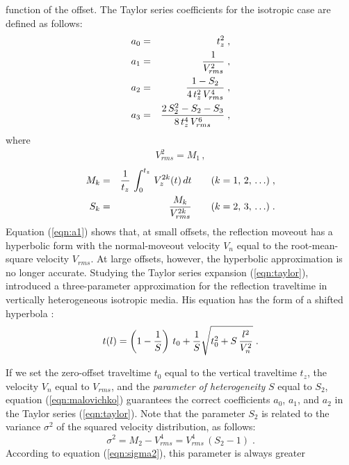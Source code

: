 function of the offset.  The Taylor series coefficients for the isotropic case
are defined as follows:
\begin{eqnarray}
a_0 & = & t_z^2\;,
\label{eqn:a0} \\
a_1 & = & {1 \over V_{rms}^2}\;,
\label{eqn:a1} \\
a_2 & = & {{1 - S_2} \over {4\,t_z^2\,V_{rms}^4}}\;,
\label{eqn:a2} \\
a_3 & = & {{2\,S_2^2 -  S_2 - S_3} \over {8\,t_z^4\,V_{rms}^6}}\;,
\label{eqn:a3}
\end{eqnarray}
where 
\begin{eqnarray}
V_{rms}^2 = M_1 \, ,
\label{eqn:a31}
\end{eqnarray}
\begin{eqnarray}
M_k & = & {1 \over t_z}\,\int_{0}^{t_z}\,V_z^{2k}(t)\,dt \qquad
(k = 1, \, 2, \, \ldots)\;,
\label{eqn:mk} \\
S_k & = & {M_k \over {V_{rms}^{2k}}} \qquad (k = 2, \, 3, \, \ldots)\;.
\label{eqn:sk}
\end{eqnarray}
Equation (\ref{eqn:a1}) shows that, at small offsets, the reflection
moveout has a hyperbolic form with the normal-moveout velocity $V_n$
equal to the root-mean-square velocity $V_{rms}$. At large offsets,
however, the hyperbolic approximation is no longer accurate.  Studying
the Taylor series expansion (\ref{eqn:taylor}), \cite{malov}
introduced a three-parameter approximation for the reflection
traveltime in vertically heterogeneous isotropic media.
His equation has the form of a
shifted hyperbola \cite[]{castle,nmo}:
\begin{equation}
t(l) = \left(1 - {1 \over S}\right)\,t_0 + 
{1 \over S} \sqrt{t_0^2 + S\,{l^2 \over V_n^2}}\;.
\label{eqn:malovichko}
\end{equation}
\par
If we set the zero-offset traveltime $t_0$ equal to the vertical
traveltime $t_z$, the velocity $V_n$ equal to $V_{rms}$, and the {\em
parameter of heterogeneity} $S$ equal to $S_2$, equation
(\ref{eqn:malovichko}) guarantees the correct coefficients $a_0$, $a_1$, and
$a_2$ in the Taylor series (\ref{eqn:taylor}). Note that the parameter $S_2$
is related to the variance $\sigma^2$ of the squared velocity
distribution, as follows:
\begin{equation}
\sigma^2 = M_2 - V_{rms}^4 = V_{rms}^4\,(S_2 -1)\;.
\label{eqn:sigma2}
\end{equation}
According to equation (\ref{eqn:sigma2}), this parameter is always greater
